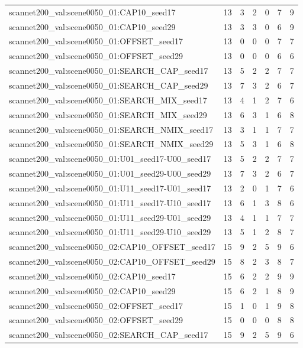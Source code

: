 \begin{table}[t]
\begin{tabular}{lrrrrrr}
scannet200\_val:scene0050\_01:CAP10\_seed17 & 13 & 3 & 2 & 0 & 7 & 9 \\
scannet200\_val:scene0050\_01:CAP10\_seed29 & 13 & 3 & 3 & 0 & 6 & 9 \\
scannet200\_val:scene0050\_01:OFFSET\_seed17 & 13 & 0 & 0 & 0 & 7 & 7 \\
scannet200\_val:scene0050\_01:OFFSET\_seed29 & 13 & 0 & 0 & 0 & 6 & 6 \\
scannet200\_val:scene0050\_01:SEARCH\_CAP\_seed17 & 13 & 5 & 2 & 2 & 7 & 7 \\
scannet200\_val:scene0050\_01:SEARCH\_CAP\_seed29 & 13 & 7 & 3 & 2 & 6 & 7 \\
scannet200\_val:scene0050\_01:SEARCH\_MIX\_seed17 & 13 & 4 & 1 & 2 & 7 & 6 \\
scannet200\_val:scene0050\_01:SEARCH\_MIX\_seed29 & 13 & 6 & 3 & 1 & 6 & 8 \\
scannet200\_val:scene0050\_01:SEARCH\_NMIX\_seed17 & 13 & 3 & 1 & 1 & 7 & 7 \\
scannet200\_val:scene0050\_01:SEARCH\_NMIX\_seed29 & 13 & 5 & 3 & 1 & 6 & 8 \\
scannet200\_val:scene0050\_01:U01\_seed17-U00\_seed17 & 13 & 5 & 2 & 2 & 7 & 7 \\
scannet200\_val:scene0050\_01:U01\_seed29-U00\_seed29 & 13 & 7 & 3 & 2 & 6 & 7 \\
scannet200\_val:scene0050\_01:U11\_seed17-U01\_seed17 & 13 & 2 & 0 & 1 & 7 & 6 \\
scannet200\_val:scene0050\_01:U11\_seed17-U10\_seed17 & 13 & 6 & 1 & 3 & 8 & 6 \\
scannet200\_val:scene0050\_01:U11\_seed29-U01\_seed29 & 13 & 4 & 1 & 1 & 7 & 7 \\
scannet200\_val:scene0050\_01:U11\_seed29-U10\_seed29 & 13 & 5 & 1 & 2 & 8 & 7 \\
scannet200\_val:scene0050\_02:CAP10\_OFFSET\_seed17 & 15 & 9 & 2 & 5 & 9 & 6 \\
scannet200\_val:scene0050\_02:CAP10\_OFFSET\_seed29 & 15 & 8 & 2 & 3 & 8 & 7 \\
scannet200\_val:scene0050\_02:CAP10\_seed17 & 15 & 6 & 2 & 2 & 9 & 9 \\
scannet200\_val:scene0050\_02:CAP10\_seed29 & 15 & 6 & 2 & 1 & 8 & 9 \\
scannet200\_val:scene0050\_02:OFFSET\_seed17 & 15 & 1 & 0 & 1 & 9 & 8 \\
scannet200\_val:scene0050\_02:OFFSET\_seed29 & 15 & 0 & 0 & 0 & 8 & 8 \\
scannet200\_val:scene0050\_02:SEARCH\_CAP\_seed17 & 15 & 9 & 2 & 5 & 9 & 6 \\

\end{tabular}
\end{table}
